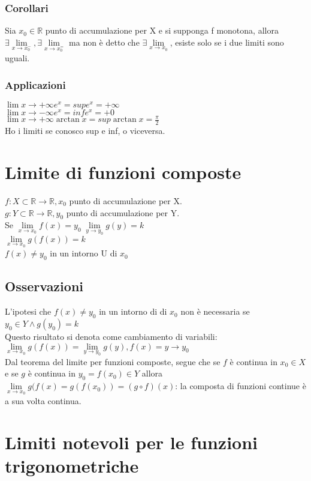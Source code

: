 \subsubsection{Corollari}
Sia $x_0\in\mathbb{R}$ punto di accumulazione per X e si supponga f monotona, allora $\exists\lim\limits_{x\rightarrow x_0^-}, \exists\lim\limits_{x\rightarrow x_0^=}$ ma non \`e detto che  $\exists\lim\limits_{x\rightarrow x_0}$, esiste solo se i due limiti sono uguali.
\subsubsection{Applicazioni}
$\lim\limits{x\rightarrow +\infty} e^x= sup e^x=+\infty$\\
$\lim\limits{x\rightarrow -\infty} e^x= inf e^x=+0$\\
$\lim\limits{x\rightarrow +\infty} \arctan x= sup \arctan x=\frac{\pi}{2}$\\
Ho i limiti se conosco sup e inf, o viceversa.
\section{Limite di funzioni composte}
$f: X\subset\mathbb{R}\rightarrow\mathbb{R}, x_0$ punto di accumulazione per X.\\
$g: Y\subset\mathbb{R}\rightarrow\mathbb{R}, y_0$ punto di accumulazione per Y.\\
Se $\lim\limits_{x\rightarrow x_0} f(x)=y_0\;\lim\limits_{y\rightarrow y_0} g(y)=k$\\
$\lim\limits_{x\rightarrow x_0} g(f(x))=k$\\
$f(x)\neq y_0$ in un intorno U di $x_0$
\subsection{Osservazioni}
L'ipotesi che $f(x)\neq y_0$ in un intorno di di $x_0$ non \`e necessaria se $y_0\in Y\wedge g(y_0)=k$\\
Questo risultato si denota come cambiamento di variabili: $\lim\limits_{x\rightarrow x_0} g(f(x))=\lim\limits_{y\rightarrow y_0} g(y), f(x)=y\rightarrow y_0$\\
Dal teorema del limite per funzioni composte, segue che se $f$ \`e continua in $x_0\in X$ e se $g$ \`e continua in $y_0=f(x_0)\in Y$ allora $\lim\limits_{x\rightarrow x_0} g(f(x)=g(f(x_0))=(g\circ f)(x)$: la composta di funzioni continue \`e a sua volta continua.
\section{Limiti notevoli per le funzioni trigonometriche}
